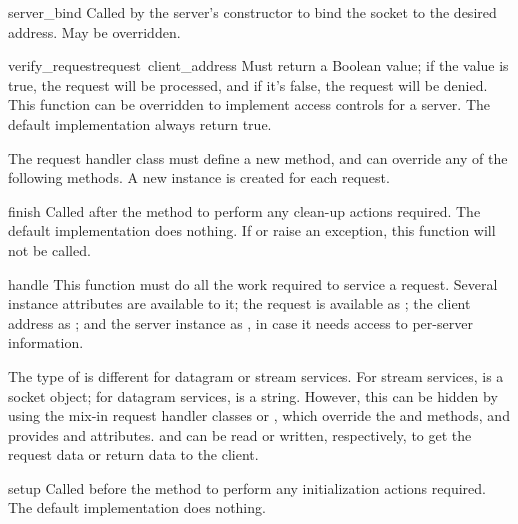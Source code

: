 \begin{funcdesc}{server_bind}{}
Called by the server's constructor to bind the socket to the desired
address.  May be overridden.
\end{funcdesc}

\begin{funcdesc}{verify_request}{request\, client_address}
Must return a Boolean value; if the value is true, the request will be
processed, and if it's false, the request will be denied.
This function can be overridden to implement access controls for a server.
The default implementation always return true.
\end{funcdesc}

The request handler class must define a new  method,
and can override any of the following methods.  A new instance is
created for each request.

\begin{funcdesc}{finish}{}
Called after the  method to perform any clean-up
actions required.  The default implementation does nothing.  If
 or  raise an exception, this
function will not be called.
\end{funcdesc}

\begin{funcdesc}{handle}{}
This function must do all the work required to service a request.
Several instance attributes are available to it; the request is
available as ; the client address as
; and the server instance as
, in case it needs access to per-server
information.

The type of  is different for datagram or stream
services.  For stream services,  is a socket
object; for datagram services,  is a string.
However, this can be hidden by using the mix-in request handler
classes
 or , which
override the  and  methods, and
provides  and  attributes.
 and  can be read or written,
respectively, to get the request data or return data to the client.
\end{funcdesc}

\begin{funcdesc}{setup}{}
Called before the  method to perform any
initialization actions required.  The default implementation does
nothing.
\end{funcdesc}
